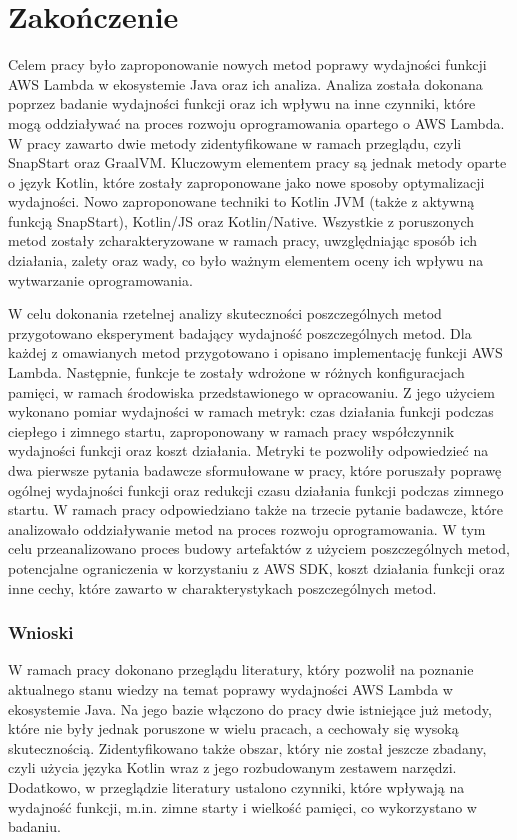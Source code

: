 \chapter*{Zakończenie}\label{chapter:zakonczenie}

Celem pracy było zaproponowanie nowych metod poprawy wydajności funkcji AWS Lambda w ekosystemie Java oraz ich analiza.
Analiza została dokonana poprzez badanie wydajności funkcji oraz ich wpływu na inne czynniki, które mogą oddziaływać na proces rozwoju oprogramowania opartego o AWS Lambda.
W pracy zawarto dwie metody zidentyfikowane w ramach przeglądu, czyli SnapStart oraz GraalVM.
Kluczowym elementem pracy są jednak metody oparte o język Kotlin, które zostały zaproponowane jako nowe sposoby optymalizacji wydajności.
Nowo zaproponowane techniki to Kotlin JVM (także z aktywną funkcją SnapStart), Kotlin/JS oraz Kotlin/Native.
Wszystkie z poruszonych metod zostały zcharakteryzowane w ramach pracy, uwzględniając sposób ich działania, zalety oraz wady, co było ważnym elementem oceny ich wpływu na wytwarzanie oprogramowania.

W celu dokonania rzetelnej analizy skuteczności poszczególnych metod przygotowano eksperyment badający wydajność poszczególnych metod.
Dla każdej z omawianych metod przygotowano i opisano implementację funkcji AWS Lambda.
Następnie, funkcje te zostały wdrożone w różnych konfiguracjach pamięci, w ramach środowiska przedstawionego w opracowaniu.
Z jego użyciem wykonano pomiar wydajności w ramach metryk: czas działania funkcji podczas ciepłego i zimnego startu, zaproponowany w ramach pracy współczynnik wydajności funkcji oraz koszt działania.
Metryki te pozwoliły odpowiedzieć na dwa pierwsze pytania badawcze sformułowane w pracy, które poruszały poprawę ogólnej wydajności funkcji oraz redukcji czasu działania funkcji podczas zimnego startu.
W ramach pracy odpowiedziano także na trzecie pytanie badawcze, które analizowało oddziaływanie metod na proces rozwoju oprogramowania.
W tym celu przeanalizowano proces budowy artefaktów z użyciem poszczególnych metod, potencjalne ograniczenia w korzystaniu z AWS SDK, koszt działania funkcji oraz inne cechy, które zawarto w charakterystykach poszczególnych metod.

\subsection*{Wnioski}

W ramach pracy dokonano przeglądu literatury, który pozwolił na poznanie aktualnego stanu wiedzy na temat poprawy wydajności AWS Lambda w ekosystemie Java.
Na jego bazie włączono do pracy dwie istniejące już metody, które nie były jednak poruszone w wielu pracach, a cechowały się wysoką skutecznością.
Zidentyfikowano także obszar, który nie został jeszcze zbadany, czyli użycia języka Kotlin wraz z jego rozbudowanym zestawem narzędzi.
Dodatkowo, w przeglądzie literatury ustalono czynniki, które wpływają na wydajność funkcji, m.in. zimne starty i wielkość pamięci, co wykorzystano w badaniu.

